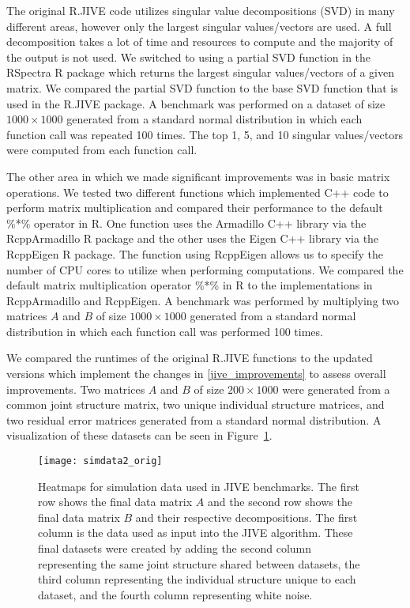 \documentclass[
12pt, %
letterpaper, %
oneside, %
headinclude,footinclude, %
BCOR5mm, %
]{scrartcl}
\begin{document}
The original R.JIVE code utilizes singular value decompositions (SVD) in many different areas, however only the largest singular values/vectors are used. A full decomposition takes a lot of time and resources to compute and the majority of the output is not used. We switched to using a partial SVD function in the RSpectra R package which returns the largest singular values/vectors of a given matrix.
We compared the partial SVD function to the base SVD function that is used in the R.JIVE package. A benchmark was performed on a dataset of size $1000 \times 1000$ generated from a standard normal distribution in which each function call was repeated 100 times. The top 1, 5, and 10 singular values/vectors were computed from each function call.

The other area in which we made significant improvements was in basic matrix operations. We tested two different functions which implemented C++ code to perform matrix multiplication and compared their performance to the default \%*\% operator in R. One function uses the Armadillo C++ library via the RcppArmadillo R package \citep{eddelbuettel2014rcpparmadillo} and the other uses the Eigen C++ library via the RcppEigen R package. The function using RcppEigen allows us to specify the number of CPU cores to utilize when performing computations.
We compared the default matrix multiplication operator \%*\% in R to the implementations in RcppArmadillo and RcppEigen. A benchmark was performed by multiplying two matrices $A$ and $B$ of size $1000 \times 1000$ generated from a standard normal distribution in which each function call was performed 100 times.

We compared the runtimes of the original R.JIVE functions to the updated versions which implement the changes in \ref{jive_improvements} to assess overall improvements. Two matrices $A$ and $B$ of size $200 \times 1000$ were generated from a common joint structure matrix, two unique individual structure matrices, and two residual error matrices generated from a standard normal distribution. A visualization of these datasets can be seen in Figure~\ref{fig:simdata2_orig}.

\begin{figure}[ht]
    \centering 
    \texttt{[image: simdata2\_orig]} 
    \caption[Simulation Data for JIVE Benchmarks]{Heatmaps for simulation data used in JIVE benchmarks. The first row shows the final data matrix $A$ and the second row shows the final data matrix $B$ and their respective decompositions. The first column is the data used as input into the JIVE algorithm. These final datasets were created by adding the second column representing the same joint structure shared between datasets, the third column representing the individual structure unique to each dataset, and the fourth column representing white noise.}
    \label{fig:simdata2_orig} 
\end{figure}
\end{document}
